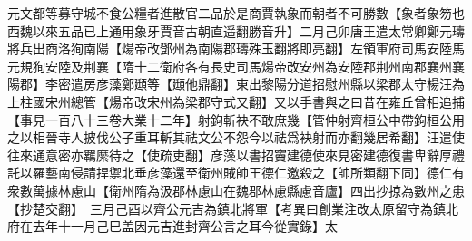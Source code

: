 元文都等募守城不食公糧者進散官二品於是商賈執象而朝者不可勝數【象者象笏也西魏以來五品已上通用象牙賈音古朝直遥翻勝音升】二月己卯唐王遣太常卿鄭元璹將兵出商洛狥南陽【煬帝改鄧州為南陽郡璹殊玉翻將即亮翻】左領軍府司馬安陸馬元規狥安陸及荆襄【隋十二衛府各有長史司馬煬帝改安州為安陸郡荆州南郡襄州襄陽郡】李密遣房彦藻鄭頲等【頲他鼎翻】東出黎陽分道招慰州縣以梁郡太守楊汪為上柱國宋州總管【煬帝改宋州為梁郡守式又翻】又以手書與之曰昔在雍丘曾相追捕【事見一百八十三卷大業十二年】射鉤斬袂不敢庶幾【管仲射齊桓公中帶鉤桓公用之以相晉寺人披伐公子重耳斬其祛文公不怨今以祛爲袂射而亦翻幾居希翻】汪遣使往來通意密亦羈縻待之【使疏吏翻】彦藻以書招竇建德使來見密建德復書卑辭厚禮託以羅藝南侵請捍禦北垂彦藻還至衛州賊帥王德仁邀殺之【帥所類翻下同】德仁有衆數萬據林慮山【衛州隋為汲郡林慮山在魏郡林慮縣慮音廬】四出抄掠為數州之患【抄楚交翻】　三月己酉以齊公元吉為鎮北將軍【考異曰創業注改太原留守為鎮北府在去年十一月己巳盖因元吉進封齊公言之耳今從實錄】太

